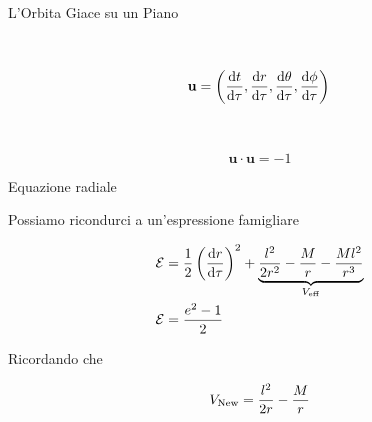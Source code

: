 \begin{frame}{L'Orbita Giace su un Piano}
\begin{minipage}{0.49 \textwidth}
        ~

        \begin{equation*}
            \mathbf{u} = \left( \dv{t}{\tau}, \dv{r}{\tau}, \dv{\theta}{\tau},
            \dv{\phi}{\tau} \right) \\
        \end{equation*}

        ~

        \begin{equation*}
            \mathbf{u \cdot u} = -1
        \end{equation*}
    \end{minipage}

\end{frame}
 

\begin{frame}{Equazione radiale}

    Possiamo ricondurci a un'espressione famigliare

    \begin{align*}
        \mathcal E &= \frac{1}{2} \left( \dv{r}{\tau} \right)^2
        + \underbrace{\frac{l^2}{2 r^2} - \frac{M}{r} - \frac{M l^2}{r^3}}_{V_{\rm eff}} \\
        \mathcal E &= \frac{e^2 - 1}{2}
    \end{align*}

    Ricordando che 

    \begin{equation*}
        V_{\rm New} = \frac{l^2}{2 r} - \frac{M}{r}
    \end{equation*}

\end{frame}


